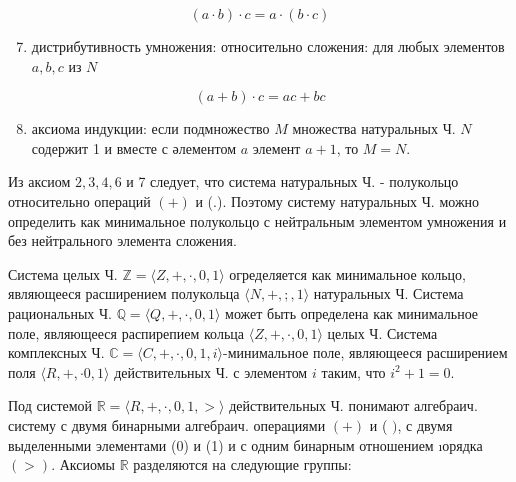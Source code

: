 \documentclass[10pt]{article}
\begin{document}
\[

(a \cdot b) \cdot c=a \cdot(b \cdot c)

\]



\begin{enumerate}

  \setcounter{enumi}{6}

  \item дистрибутивность умножения: относительно сложения: для любых элементов $a, b, c$ из $N$

\end{enumerate}



\[

(a+b) \cdot c=a c+b c

\]



\begin{enumerate}

  \setcounter{enumi}{7}

  \item аксиома индукции: если подмножество $M$ множества натуральных Ч. $N$ содержит 1 и вместе с әлементом $a$ элемент $a+1$, то $M=N$.

\end{enumerate}



Из аксиом $2,3,4,6$ и 7 следует, что система натуральных Ч. - полукольцо относительно операций $(+)$ и (.). Поэтому систему натуральных Ч. можно определить как минимальное полукольцо с нейтральным элементом умножения и без нейтрального элемента сложения.



Система целых Ч. $\mathbb{Z}=\langle Z,+, \cdot, 0,1\rangle$ огределяется как минимальное кольцо, являющееся расширением полукольца $\langle N,+, ;, 1\rangle$ натуральных Ч. Система рациональных Ч. $\mathbb{Q}=\langle Q,+, \cdot, 0,1\rangle$ может быть определена как минимальное поле, являющееся распирепием кольца $\langle Z,+, \cdot, 0,1\rangle$ целых Ч. Система комплексных Ч. $\mathbb{C}=\langle C,+, \cdot, 0,1, i\rangle$-минимальное поле, являющееся расширением поля $\langle R,+, \cdot 0,1\rangle$ действительных Ч. с элементом $i$ таким, что $i^{2}+1=0$.



Под системой $\mathbb{R}=\langle R,+, \cdot, 0,1,>\rangle$ действительных Ч. понимают алгебраич. систему с двумя бинарными алгебраич. операциями $(+)$ и ( $)$, с двумя выделенными элементами (0) и (1) и с одним бинарным отношением ıорядка $(>)$. Аксиомы $\mathbb{R}$ разделяются на следующие группы:
\end{document}
